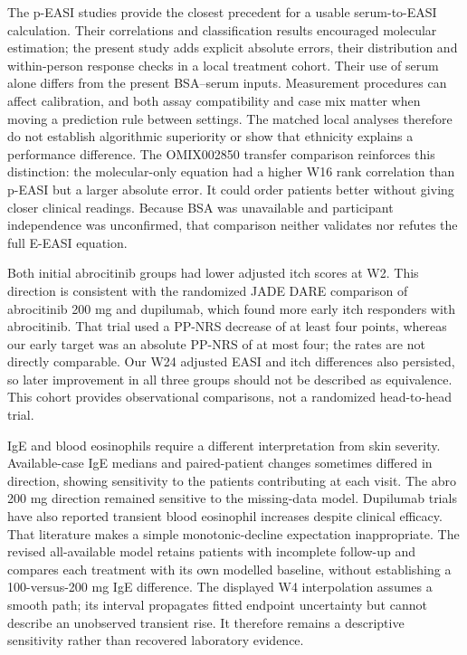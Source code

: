 The p-EASI studies provide the closest precedent for a usable serum-to-EASI calculation.\citep{thijs2017,thijs2019,bakker2020} Their correlations and classification results encouraged molecular estimation; the present study adds explicit absolute errors, their distribution and within-person response checks in a local treatment cohort. Their use of serum alone differs from the present BSA--serum inputs. Measurement procedures can affect calibration, and both assay compatibility and case mix matter when moving a prediction rule between settings.\citep{luijken2020,riley2024validation} The matched local analyses therefore do not establish algorithmic superiority or show that ethnicity explains a performance difference. The OMIX002850 transfer comparison reinforces this distinction: the molecular-only equation had a higher W16 rank correlation than p-EASI but a larger absolute error. It could order patients better without giving closer clinical readings. Because BSA was unavailable and participant independence was unconfirmed, that comparison neither validates nor refutes the full E-EASI equation.

Both initial abrocitinib groups had lower adjusted itch scores at W2. This direction is consistent with the randomized JADE DARE comparison of abrocitinib 200 mg and dupilumab, which found more early itch responders with abrocitinib.\citep{reich2022dare} That trial used a PP-NRS decrease of at least four points, whereas our early target was an absolute PP-NRS of at most four; the rates are not directly comparable. Our W24 adjusted EASI and itch differences also persisted, so later improvement in all three groups should not be described as equivalence. This cohort provides observational comparisons, not a randomized head-to-head trial.

IgE and blood eosinophils require a different interpretation from skin severity. Available-case IgE medians and paired-patient changes sometimes differed in direction, showing sensitivity to the patients contributing at each visit. The abro 200 mg direction remained sensitive to the missing-data model. Dupilumab trials have also reported transient blood eosinophil increases despite clinical efficacy.\citep{wechsler2022eosinophils} That literature makes a simple monotonic-decline expectation inappropriate. The revised all-available model retains patients with incomplete follow-up and compares each treatment with its own modelled baseline, without establishing a 100-versus-200 mg IgE difference. The displayed W4 interpolation assumes a smooth path; its interval propagates fitted endpoint uncertainty but cannot describe an unobserved transient rise. It therefore remains a descriptive sensitivity rather than recovered laboratory evidence.

